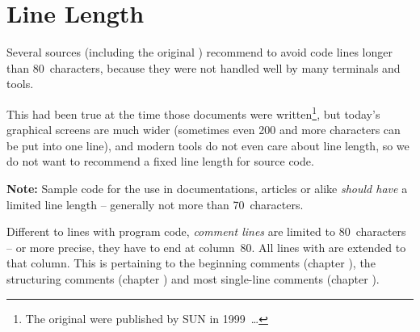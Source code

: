 \section{Line Length}\label{sec:LineLength}
Several sources (including the original \ccjpl) recommend to avoid code lines longer than 80~characters, because they were not handled well by many terminals and tools.

This had been true at the time those documents were written\footnote{The original \ccjpl were published by SUN in 1999~…}, but today's  graphical screens are much wider (sometimes even 200 and more characters can be put into one line), and modern tools do not even care about line length, so we do not want to recommend a fixed line length for source code.

\textbf{Note:} Sample code for the use in documentations, articles or alike \textit{should have} a limited line length – generally not more than 70~characters.

Different to lines with program code, \textit{comment lines} are limited to 80~characters – or more precise, they have to end at column~80. All lines with  are extended to that column. This is pertaining to the beginning comments (chapter ), the structuring comments (chapter ) and most single-line comments (chapter ).



